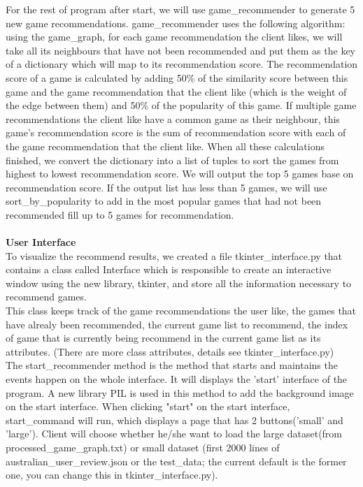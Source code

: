 \documentclass{article}
\begin{document}
For the rest of program after start, we will use game\_recommender to generate 5 new game recommendations. game\_recommender uses the following algorithm: using the game\_graph, for each game recommendation the client likes, we will take all its neighbours that have not been recommended and put them as the key of a dictionary which will map to its recommendation score. The recommendation score of a game is calculated by adding 50\% of the similarity score between this game and the game recommendation that the client like (which is the weight of the edge between them) and 50\% of the popularity of this game. If multiple game recommendations the client like have a common game as their neighbour, this game's recommendation score is the sum of recommendation score with each of the game recommendation that the client like. When all these calculations finished, we convert the dictionary into a list of tuples to sort the games from highest to lowest recommendation score. We will output the top 5 games base on recommendation score. If the output list has less than 5 games, we will use sort\_by\_popularity to add in the most popular games that had not been recommended fill up to 5 games for recommendation. \\\\
\textbf{User Interface} \\
To visualize the recommend results, we created a file tkinter\_interface.py that contains a class called Interface which is responsible to create an interactive window using the new library, tkinter, and store all the information necessary to recommend games. \\
This class keeps track of the game recommendations the user like, the games that have alrealy been recommended, the current game list to recommend, the index of game that is currently being recommend in the current game list as its attributes. (There are more class attributes, details see tkinter\_interface.py)\\
The start\_recommender method is the method that starts and maintains the events happen on the whole interface. It will displays the 'start' interface of the program. A new library PIL is used in this method to add the background image on the start interface. When clicking "start" on the start interface, start\_command will run, which displays a page that has 2 buttons('small' and 'large'). Client will choose whether he/she want to load the large dataset(from processed\_game\_graph.txt) or small dataset (first 2000 lines of australian\_user\_review.json or the test\_data; the current default is the former one, you can change this in tkinter\_interface.py).\\
\end{document}
